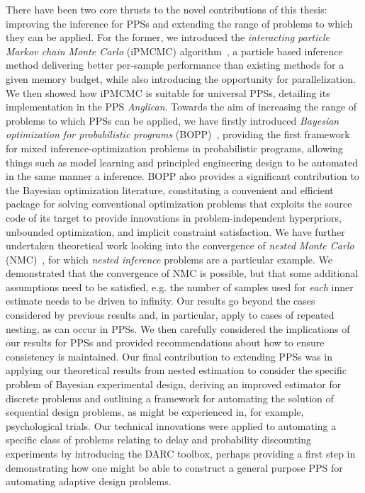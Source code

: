 There have been two core thrusts to the novel contributions of this thesis: improving the inference
for PPSs and extending the range of problems to which they can be applied.  For
the former, we introduced the \emph{interacting particle Markov chain Monte Carlo} (iPMCMC)
algorithm~\citep{rainforth2016interacting}, a particle based inference method delivering
better per-sample performance than existing methods for a given memory budget, while also introducing the opportunity for
parallelization.  We then showed how iPMCMC is suitable for universal PPSs, detailing its implementation
in the PPS \emph{Anglican}.  Towards the aim of increasing the range of problems to which PPSs can be applied, 
we have firstly introduced \emph{Bayesian optimization for probabilistic 
	programs} (BOPP)~\citep{rainforth2016bayesian}, providing
the first framework for mixed inference-optimization problems in probabilistic programs, allowing things
such as model learning and principled engineering design to be automated in the same manner a inference.
BOPP also provides a significant contribution to the Bayesian optimization literature, constituting a
convenient and efficient package for solving conventional optimization problems that exploits the
source code of its target to provide innovations in problem-independent hyperpriors, unbounded
 optimization, and implicit constraint satisfaction.
We have further undertaken theoretical work looking into the convergence of \emph{nested Monte Carlo} (NMC)~\citep{rainforth2017pitfalls}, for which \emph{nested inference} problems are a particular example.
We demonstrated that the convergence
of NMC is possible, but that some additional assumptions need
to be satisfied, e.g. the number of samples used for \emph{each} inner estimate needs to be driven
to infinity.  Our results go beyond the cases considered
by previous results and, in particular, apply to cases of repeated nesting, as can occur in PPSs.
We then carefully considered the implications of our results for PPSs and provided recommendations
about how to ensure consistency is maintained.  Our final contribution to extending PPSs was in
applying our theoretical results from nested estimation to consider the specific problem of Bayesian
experimental design, deriving an improved estimator for discrete problems and outlining a framework
for automating the solution of sequential design problems, as might be experienced in, for example,
psychological trials.  Our technical innovations were applied to automating
a specific class of problems relating to delay and probability discounting experiments by
introducing the DARC toolbox, perhaps providing a first step in demonstrating how one might
be able to construct a general purpose PPS for automating adaptive design problems.

